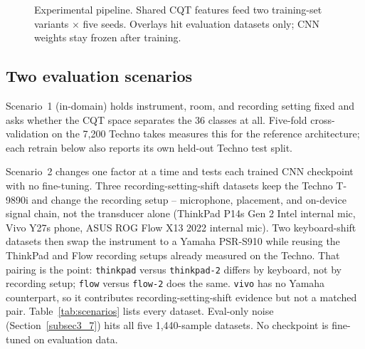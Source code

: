 \documentclass[pdflatex,sn-mathphys-num,iicol]{sn-jnl}
\theoremstyle{thmstyleone}
\theoremstyle{thmstyletwo}
\theoremstyle{thmstylethree}
\begin{document}
\begin{figure}[t]
{%
  }
  \caption{Experimental pipeline. Shared CQT features feed two training-set variants $\times$ five seeds. Overlays hit evaluation datasets only; CNN weights stay frozen after training.}
  \label{fig:methodology}
\end{figure}

\subsection{Two evaluation scenarios}\label{subsec3_0}

Scenario~1 (in-domain) holds instrument, room, and recording setting fixed and asks whether the CQT space separates the 36 classes at all. Five-fold cross-validation on the 7{,}200 Techno takes measures this for the reference architecture; each retrain below also reports its own held-out Techno test split.

Scenario~2 changes one factor at a time and tests each trained CNN checkpoint with no fine-tuning. Three recording-setting-shift datasets keep the Techno T-9890i and change the recording setup -- microphone, placement, and on-device signal chain, not the transducer alone (ThinkPad P14s Gen 2 Intel internal mic, Vivo Y27s phone, ASUS ROG Flow X13 2022 internal mic). Two keyboard-shift datasets then swap the instrument to a Yamaha PSR-S910 while reusing the ThinkPad and Flow recording setups already measured on the Techno. That pairing is the point: \texttt{thinkpad} versus \texttt{thinkpad-2} differs by keyboard, not by recording setup; \texttt{flow} versus \texttt{flow-2} does the same. \texttt{vivo} has no Yamaha counterpart, so it contributes recording-setting-shift evidence but not a matched pair. Table~\ref{tab:scenarios} lists every dataset. Eval-only noise (Section~\ref{subsec3_7}) hits all five 1{,}440-sample datasets. No checkpoint is fine-tuned on evaluation data.
\end{document}
